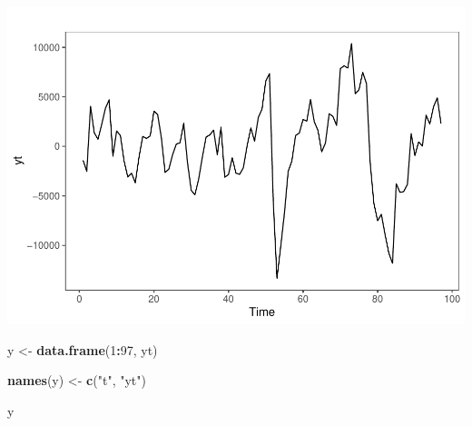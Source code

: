 \documentclass[]{article}
\newenvironment{Shaded}{\begin{snugshade}}{\end{snugshade}}
\newcommand{\DecValTok}[1]{\textcolor[rgb]{0.00,0.00,0.81}{#1}}
\newcommand{\KeywordTok}[1]{\textcolor[rgb]{0.13,0.29,0.53}{\textbf{#1}}}
\newcommand{\NormalTok}[1]{#1}
\newcommand{\OperatorTok}[1]{\textcolor[rgb]{0.81,0.36,0.00}{\textbf{#1}}}
\newcommand{\StringTok}[1]{\textcolor[rgb]{0.31,0.60,0.02}{#1}}
\begin{document}
\includegraphics{Econo2_P5_files/figure-latex/stochastic yt-1.pdf}

\begin{Shaded}
\begin{Highlighting}[]
\NormalTok{y <-}\StringTok{ }\KeywordTok{data.frame}\NormalTok{(}\DecValTok{1}\OperatorTok{:}\DecValTok{97}\NormalTok{, yt)}

\KeywordTok{names}\NormalTok{(y) <-}\StringTok{ }\KeywordTok{c}\NormalTok{(}\StringTok{"t"}\NormalTok{, }\StringTok{"yt"}\NormalTok{)}

\NormalTok{y}
\end{Highlighting}
\end{Shaded}
\end{document}
